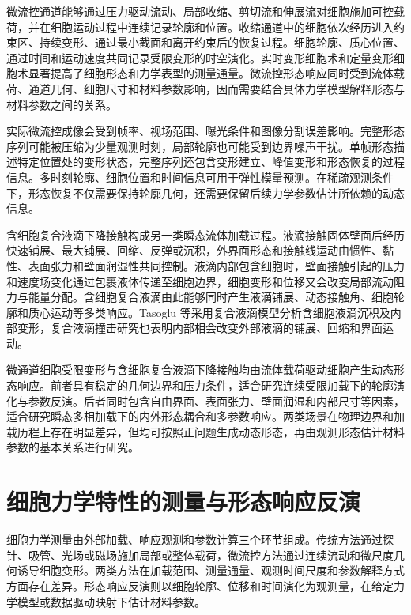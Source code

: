 微流控通道能够通过压力驱动流动、局部收缩、剪切流和伸展流对细胞施加可控载荷，并在细胞运动过程中连续记录轮廓和位置。收缩通道中的细胞依次经历进入约束区、持续变形、通过最小截面和离开约束后的恢复过程。细胞轮廓、质心位置、通过时间和运动速度共同记录受限变形的时空演化。实时变形细胞术和定量变形细胞术显著提高了细胞形态和力学表型的测量通量\cite{otto2015rtdc,nyberg2017qdc,rosendahl2018rtdc}。微流控形态响应同时受到流体载荷、通道几何、细胞尺寸和材料参数影响，因而需要结合具体力学模型解释形态与材料参数之间的关系\cite{mietke2015rtdc,mokbel2017rtdc}。

实际微流控成像会受到帧率、视场范围、曝光条件和图像分割误差影响。完整形态序列可能被压缩为少量观测时刻，局部轮廓也可能受到边界噪声干扰。单帧形态描述特定位置处的变形状态，完整序列还包含变形建立、峰值变形和形态恢复的过程信息。多时刻轮廓、细胞位置和时间信息可用于弹性模量预测\cite{gong2024prediction}。在稀疏观测条件下，形态恢复不仅需要保持轮廓几何，还需要保留后续力学参数估计所依赖的动态信息。

含细胞复合液滴下降接触构成另一类瞬态流体加载过程。液滴接触固体壁面后经历快速铺展、最大铺展、回缩、反弹或沉积，外界面形态和接触线运动由惯性、黏性、表面张力和壁面润湿性共同控制\cite{rein1993impact,yarin2006impact,josserand2016drop,snoeijer2013moving}。液滴内部包含细胞时，壁面接触引起的压力和速度场变化通过包裹液体传递至细胞边界，细胞变形和位移又会改变局部流动阻力与能量分配。含细胞复合液滴由此能够同时产生液滴铺展、动态接触角、细胞轮廓和质心运动等多类响应。Tasoglu 等采用复合液滴模型分析含细胞液滴沉积及内部变形\cite{tasoglu2010compound}，复合液滴撞击研究也表明内部相会改变外部液滴的铺展、回缩和界面运动\cite{blanken2021compoundperspective}。

微通道细胞受限变形与含细胞复合液滴下降接触均由流体载荷驱动细胞产生动态形态响应。前者具有稳定的几何边界和压力条件，适合研究连续受限加载下的轮廓演化与参数反演。后者同时包含自由界面、表面张力、壁面润湿和内部尺寸等因素，适合研究瞬态多相加载下的内外形态耦合和多参数响应。两类场景在物理边界和加载历程上存在明显差异，但均可按照正问题生成动态形态，再由观测形态估计材料参数的基本关系进行研究。

\section{细胞力学特性的测量与形态响应反演}

细胞力学测量由外部加载、响应观测和参数计算三个环节组成。传统方法通过探针、吸管、光场或磁场施加局部或整体载荷，微流控方法通过连续流动和微尺度几何诱导细胞变形。两类方法在加载范围、测量通量、观测时间尺度和参数解释方式方面存在差异。形态响应反演则以细胞轮廓、位移和时间演化为观测量，在给定力学模型或数据驱动映射下估计材料参数。

